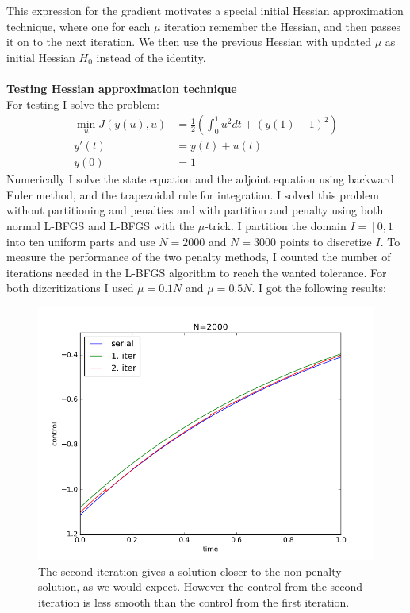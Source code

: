 \documentclass[11pt,a4paper]{article}
\begin{document}
This expression for the gradient motivates a special initial Hessian approximation technique, where one for each $\mu$ iteration remember the Hessian, and then passes it on to the next iteration. We then use the previous Hessian with updated $\mu$ as initial Hessian $H_0$ instead of the identity.
\\
\\
\textbf{Testing Hessian approximation technique} 
\\
For testing I solve the problem:
\begin{align*}
\min_{u} J(y(u),u) &= \frac{1}{2}(\int_0^1 u^2 dt + (y(1)-1)^2) \\
y'(t) &= y(t) +u(t) \\
y(0) &=1
\end{align*}
Numerically I solve the state equation and the adjoint equation using backward Euler method, and the trapezoidal rule for integration. I solved this problem without partitioning and penalties and with partition and penalty using both normal L-BFGS and L-BFGS with the $\mu$-trick. I partition the domain $I=[0,1]$ into ten uniform parts and use $N=2000$ and $N=3000$ points to discretize $I$. To measure the performance of the two penalty methods, I counted the number of iterations needed in the L-BFGS algorithm to reach the wanted tolerance. For both dizcritizations I used $\mu=0.1N$ and $\mu=0.5N$. I got the following results: 
\begin{figure}
  \includegraphics[width=\linewidth]{mufail2000.png}
  \caption{The second iteration gives a solution closer to the non-penalty solution, as we would expect. However the control from the second iteration is less smooth than the control from the first iteration.}
  \label{Fig 8}
\end{figure}
\end{document}

